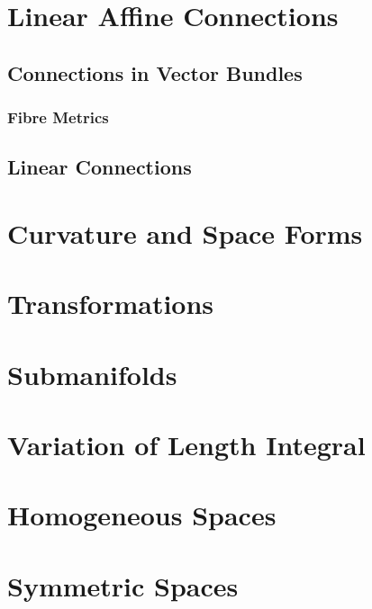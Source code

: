 \documentclass[Total.tex]{subfiles}
\begin{document}
	\chapter{Linear Affine Connections}
		\section{Connections in Vector Bundles}
			\subsection{Fibre Metrics}
		\section{Linear Connections}
	
	\chapter{Curvature and Space Forms}
	
	\chapter{Transformations}
	
	\chapter{Submanifolds}
	
	\chapter{Variation of Length Integral}
	
	\chapter{Homogeneous Spaces}
	
	\chapter{Symmetric Spaces}
\end{document}
